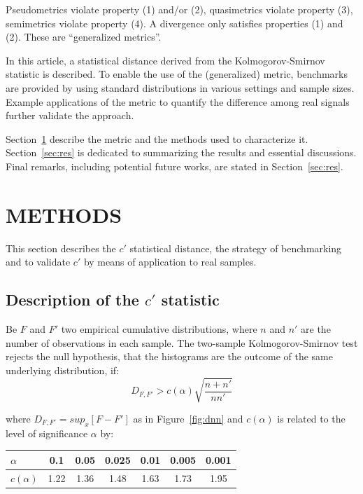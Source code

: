 \documentclass[12pt,fleqn]{article}
\begin{document}
Pseudometrics violate property (1) and/or (2),
quasimetrics violate property (3),
semimetrics violate property (4).
A divergence only satisfies properties (1) and (2).
These are ``generalized metrics''.

In this article, a statistical distance derived from the
Kolmogorov-Smirnov statistic is described.
To enable the use of the (generalized) metric,
benchmarks are provided
by using standard distributions in various settings and sample sizes.
Example applications of the metric to quantify the difference among
real signals further validate the approach.

Section~\ref{sec:met} describe the metric
and the methods used to characterize it.
Section~\ref{sec:res} is dedicated to
summarizing the results and essential discussions.
Final remarks, including potential future works,
are stated in Section~\ref{sec:res}.


\section{METHODS}\label{sec:met}
This section describes the $c'$ statistical distance,
the strategy of benchmarking and to validate $c'$ by means
of application to real samples.


\subsection{Description of the $c'$ statistic}
Be $F$ and $F'$ two empirical cumulative distributions,
where $n$ and $n'$ are the number of observations in each sample.
The two-sample Kolmogorov-Smirnov test rejects the null hypothesis,
that the histograms are the outcome of the same underlying distribution,
if:
\begin{equation}\label{eq:ks}
D_{F,F'} > c(\alpha)\sqrt{\frac{n+n'}{nn'}}
\end{equation}

\noindent where $D_{F,F'}=sup_x[F-F']$ as in Figure~\ref{fig:dnn}
and $c(\alpha)$ is related to the level of significance $\alpha$ by:

\begin{table}[h!]
\centering
\begin{tabular}{|l||c|c|c|c|c|c|}\hline
$\alpha$    & 0.1  & 0.05 & 0.025 & 0.01 & 0.005 & 0.001 \\\hline
$c(\alpha)$ & 1.22 & 1.36 & 1.48  & 1.63 & 1.73  & 1.95  \\\hline
\end{tabular}
\end{table}
\end{document}
